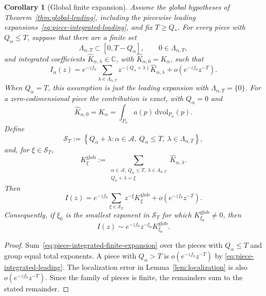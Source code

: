 \documentclass[11pt]{amsart}
\numberwithin{equation}{section}
\newtheorem{corollary}[theorem]{Corollary}
\theoremstyle{definition}
\theoremstyle{remark}
\newcommand{\C}{\mathbb{C}}
\newcommand{\dvol}{\,\mathrm{dvol}}
\newcommand{\cA}{\mathcal{A}}
\begin{document}
\begin{corollary}[Global finite expansion]\label{cor:global-finite-expansion}
Assume the global hypotheses of Theorem~\ref{thm:global-leading}, including the
piecewise leading expansions~\eqref{eq:piece-integrated-leading}, and fix
$T\ge Q_*$.  For every piece with $Q_\alpha\le T$, suppose that there are a
finite set
\[
 \Lambda_{\alpha,T}\subset[0,T-Q_\alpha],
 \qquad 0\in\Lambda_{\alpha,T},
\]
and integrated coefficients $\widehat K_{\alpha,\lambda}\in\C$, with
$\widehat K_{\alpha,0}=K_\alpha$, such that
\begin{equation}\label{eq:piece-integrated-finite-expansion}
 I_\alpha(z)=e^{-zf_0}
 \sum_{\lambda\in\Lambda_{\alpha,T}}
 z^{-(Q_\alpha+\lambda)}\widehat K_{\alpha,\lambda}
 +o\left(e^{-zf_0}z^{-T}\right).
\end{equation}
When $Q_\alpha=T$, this assumption is just the leading expansion with
$\Lambda_{\alpha,T}=\{0\}$.  For a zero-codimensional piece the contribution is
exact, with $Q_\alpha=0$ and
\[
 \widehat K_{\alpha,0}=K_\alpha
 =\int_{P_\alpha}a(p)\dvol_{P_\alpha}(p).
\]
Define
\[
 \mathcal S_T:=\left\{Q_\alpha+\lambda:
 \alpha\in\cA,\ Q_\alpha\le T,\
 \lambda\in\Lambda_{\alpha,T}\right\},
\]
and, for $\xi\in\mathcal S_T$,
\begin{equation}\label{eq:global-expansion-coeff}
 K^{\mathrm{glob}}_\xi:=
 \sum_{\substack{\alpha\in\cA,\ Q_\alpha\le T,\
                   \lambda\in\Lambda_{\alpha,T}\\
                   Q_\alpha+\lambda=\xi}}
 \widehat K_{\alpha,\lambda}.
\end{equation}
Then
\begin{equation}\label{eq:global-finite-expansion}
 I(z)=e^{-zf_0}\sum_{\xi\in\mathcal S_T}z^{-\xi}K^{\mathrm{glob}}_\xi
 +o\left(e^{-zf_0}z^{-T}\right).
\end{equation}
Consequently, if $\xi_0$ is the smallest exponent in $\mathcal S_T$ for which
$K^{\mathrm{glob}}_{\xi_0}\ne0$, then
\[
 I(z)\sim e^{-zf_0}z^{-\xi_0}K^{\mathrm{glob}}_{\xi_0}.
\]
\end{corollary}

\begin{proof}
Sum~\eqref{eq:piece-integrated-finite-expansion} over the pieces with
$Q_\alpha\le T$ and group equal total exponents.  A piece with
$Q_\alpha>T$ is $o(e^{-zf_0}z^{-T})$ by
\eqref{eq:piece-integrated-leading}.  The localization error in
Lemma~\ref{lem:localization} is also $o(e^{-zf_0}z^{-T})$.  Since the family of
pieces is finite, the remainders sum to the stated remainder.
\end{proof}
\end{document}
